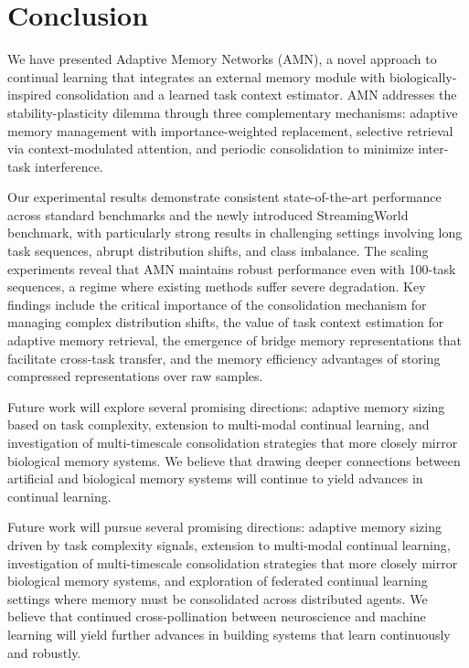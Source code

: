 \documentclass[11pt]{article}
\begin{document}
\section{Conclusion}
\label{sec:conclusion}

We have presented Adaptive Memory Networks (AMN), a novel approach to continual learning that integrates an external memory module with biologically-inspired consolidation and a learned task context estimator. AMN addresses the stability-plasticity dilemma through three complementary mechanisms: adaptive memory management with importance-weighted replacement, selective retrieval via context-modulated attention, and periodic consolidation to minimize inter-task interference.


Our experimental results demonstrate consistent state-of-the-art performance across standard benchmarks and the newly introduced StreamingWorld benchmark, with particularly strong results in challenging settings involving long task sequences, abrupt distribution shifts, and class imbalance. The scaling experiments reveal that AMN maintains robust performance even with 100-task sequences, a regime where existing methods suffer severe degradation.
Key findings include the critical importance of the consolidation mechanism for managing complex distribution shifts, the value of task context estimation for adaptive memory retrieval, the emergence of bridge memory representations that facilitate cross-task transfer, and the memory efficiency advantages of storing compressed representations over raw samples.

Future work will explore several promising directions: adaptive memory sizing based on task complexity, extension to multi-modal continual learning, and investigation of multi-timescale consolidation strategies that more closely mirror biological memory systems. We believe that drawing deeper connections between artificial and biological memory systems will continue to yield advances in continual learning.

Future work will pursue several promising directions: adaptive memory sizing driven by task complexity signals, extension to multi-modal continual learning, investigation of multi-timescale consolidation strategies that more closely mirror biological memory systems, and exploration of federated continual learning settings where memory must be consolidated across distributed agents. We believe that continued cross-pollination between neuroscience and machine learning will yield further advances in building systems that learn continuously and robustly.
\end{document}
